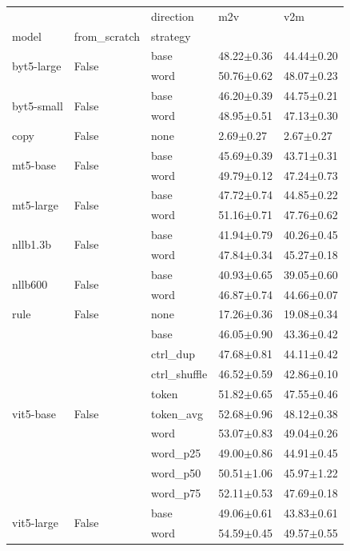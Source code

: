 \begin{tabular}{lllll}
\toprule
 &  & direction & m2v & v2m \\
model & from_scratch & strategy &  &  \\
\midrule
\multirow[t]{2}{*}{byt5-large} & \multirow[t]{2}{*}{False} & base & 48.22$\pm$0.36 & 44.44$\pm$0.20 \\
 &  & word & 50.76$\pm$0.62 & 48.07$\pm$0.23 \\
\cline{1-5} \cline{2-5}
\multirow[t]{2}{*}{byt5-small} & \multirow[t]{2}{*}{False} & base & 46.20$\pm$0.39 & 44.75$\pm$0.21 \\
 &  & word & 48.95$\pm$0.51 & 47.13$\pm$0.30 \\
\cline{1-5} \cline{2-5}
copy & False & none & 2.69$\pm$0.27 & 2.67$\pm$0.27 \\
\cline{1-5} \cline{2-5}
\multirow[t]{2}{*}{mt5-base} & \multirow[t]{2}{*}{False} & base & 45.69$\pm$0.39 & 43.71$\pm$0.31 \\
 &  & word & 49.79$\pm$0.12 & 47.24$\pm$0.73 \\
\cline{1-5} \cline{2-5}
\multirow[t]{2}{*}{mt5-large} & \multirow[t]{2}{*}{False} & base & 47.72$\pm$0.74 & 44.85$\pm$0.22 \\
 &  & word & 51.16$\pm$0.71 & 47.76$\pm$0.62 \\
\cline{1-5} \cline{2-5}
\multirow[t]{2}{*}{nllb1.3b} & \multirow[t]{2}{*}{False} & base & 41.94$\pm$0.79 & 40.26$\pm$0.45 \\
 &  & word & 47.84$\pm$0.34 & 45.27$\pm$0.18 \\
\cline{1-5} \cline{2-5}
\multirow[t]{2}{*}{nllb600} & \multirow[t]{2}{*}{False} & base & 40.93$\pm$0.65 & 39.05$\pm$0.60 \\
 &  & word & 46.87$\pm$0.74 & 44.66$\pm$0.07 \\
\cline{1-5} \cline{2-5}
rule & False & none & 17.26$\pm$0.36 & 19.08$\pm$0.34 \\
\cline{1-5} \cline{2-5}
\multirow[t]{9}{*}{vit5-base} & \multirow[t]{9}{*}{False} & base & 46.05$\pm$0.90 & 43.36$\pm$0.42 \\
 &  & ctrl_dup & 47.68$\pm$0.81 & 44.11$\pm$0.42 \\
 &  & ctrl_shuffle & 46.52$\pm$0.59 & 42.86$\pm$0.10 \\
 &  & token & 51.82$\pm$0.65 & 47.55$\pm$0.46 \\
 &  & token_avg & 52.68$\pm$0.96 & 48.12$\pm$0.38 \\
 &  & word & 53.07$\pm$0.83 & 49.04$\pm$0.26 \\
 &  & word_p25 & 49.00$\pm$0.86 & 44.91$\pm$0.45 \\
 &  & word_p50 & 50.51$\pm$1.06 & 45.97$\pm$1.22 \\
 &  & word_p75 & 52.11$\pm$0.53 & 47.69$\pm$0.18 \\
\cline{1-5} \cline{2-5}
\multirow[t]{2}{*}{vit5-large} & \multirow[t]{2}{*}{False} & base & 49.06$\pm$0.61 & 43.83$\pm$0.61 \\
 &  & word & 54.59$\pm$0.45 & 49.57$\pm$0.55 \\
\cline{1-5} \cline{2-5}
\bottomrule
\end{tabular}
